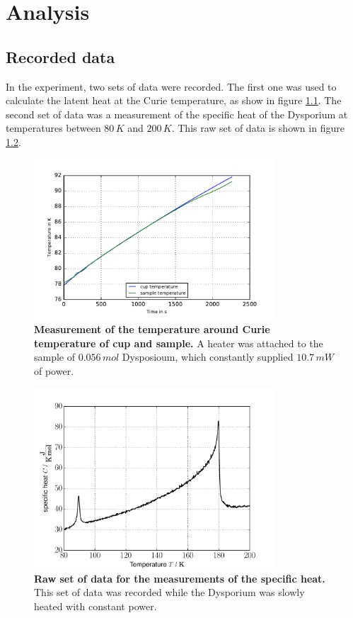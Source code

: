 \documentclass{include/thesisclass3}
\newcommand{\e}[1]{\,\si{#1}}
\begin{document}
\chapter{Analysis}


\section{Recorded data}
In the experiment, two sets of data were recorded.
The first one was used to calculate the latent heat at the Curie temperature, as show in figure \ref{latent_raw_j}.
The second set of data was a measurement of the specific heat of the Dysporium at temperatures between $80\e{K}$ and $200\e{K}$. This raw set of data is shown in figure \ref{data}.
\begin{figure}[h]
\includegraphics[width = 0.8\textwidth]{fig/latent_raw_j.pdf}
\caption{\label{latent_raw_j}\textbf{Measurement of the temperature around Curie temperature of cup and sample.} A heater was attached to the sample of $0.056\e{mol}$ Dysposioum, which constantly supplied $10.7\e{mW}$ of power.}
\end{figure}
\begin{figure}[h]
\includegraphics[width = 0.8\textwidth]{fig/data.pdf}
\caption{\label{data}\textbf{Raw set of data for the measurements of the specific heat.} This set of data was recorded while the Dysporium was slowly heated with constant power.}
\end{figure}
\end{document}
